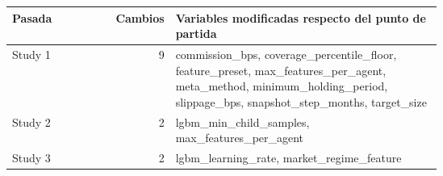\begin{tabular}{lrp{0.62\linewidth}}
\toprule
Pasada & Cambios & Variables modificadas respecto del punto de partida \\
\midrule
Study 1 & 9 & commission\_bps, coverage\_percentile\_floor, feature\_preset, max\_features\_per\_agent, meta\_method, minimum\_holding\_period, slippage\_bps, snapshot\_step\_months, target\_size \\
Study 2 & 2 & lgbm\_min\_child\_samples, max\_features\_per\_agent \\
Study 3 & 2 & lgbm\_learning\_rate, market\_regime\_feature \\
\bottomrule
\end{tabular}
